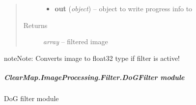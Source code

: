 \documentclass[letterpaper,10pt,english]{sphinxmanual}
\begin{document}
\begin{fulllineitems}
\begin{quote}
\begin{description}
\begin{itemize}
\item {} 
\textbf{out} (\emph{object}) --
object to write progress info to

\end{itemize}

\item[{Returns}] \leavevmode
\emph{array} --
filtered image

\end{description}\end{quote}

\begin{notice}{note}{Note:}
Converts image to float32 type if filter is active!
\end{notice}

\end{fulllineitems}



\subparagraph{ClearMap.ImageProcessing.Filter.DoGFilter module}
\label{api/ClearMap.ImageProcessing.Filter:module-ClearMap.ImageProcessing.Filter.DoGFilter}\label{api/ClearMap.ImageProcessing.Filter:clearmap-imageprocessing-filter-dogfilter-module}
DoG filter module
\end{document}
